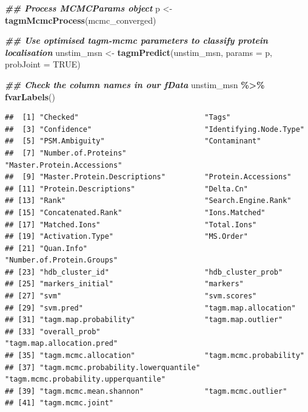 \documentclass[9pt,a4paper,]{extarticle}
\newenvironment{Shaded}{\begin{snugshade}}{\end{snugshade}}
\newcommand{\AttributeTok}[1]{\textcolor[rgb]{0.13,0.29,0.53}{#1}}
\newcommand{\ConstantTok}[1]{\textcolor[rgb]{0.56,0.35,0.01}{#1}}
\newcommand{\DocumentationTok}[1]{\textcolor[rgb]{0.56,0.35,0.01}{\textbf{\textit{#1}}}}
\newcommand{\FunctionTok}[1]{\textcolor[rgb]{0.13,0.29,0.53}{\textbf{#1}}}
\newcommand{\NormalTok}[1]{#1}
\newcommand{\OtherTok}[1]{\textcolor[rgb]{0.56,0.35,0.01}{#1}}
\newcommand{\SpecialCharTok}[1]{\textcolor[rgb]{0.81,0.36,0.00}{\textbf{#1}}}
\begin{document}
\begin{Shaded}
\begin{Highlighting}[]
\DocumentationTok{\#\# Process MCMCParams object}
\NormalTok{p }\OtherTok{\textless{}{-}} \FunctionTok{tagmMcmcProcess}\NormalTok{(mcmc\_converged)}
\end{Highlighting}
\end{Shaded}

\begin{Shaded}
\begin{Highlighting}[]
\DocumentationTok{\#\# Use optimised tagm{-}mcmc parameters to classify protein localisation}
\NormalTok{unstim\_msn }\OtherTok{\textless{}{-}} \FunctionTok{tagmPredict}\NormalTok{(unstim\_msn, }\AttributeTok{params =}\NormalTok{ p, }\AttributeTok{probJoint =} \ConstantTok{TRUE}\NormalTok{)}

\DocumentationTok{\#\# Check the column names in our fData}
\NormalTok{unstim\_msn }\SpecialCharTok{\%\textgreater{}\%} 
  \FunctionTok{fvarLabels}\NormalTok{()}
\end{Highlighting}
\end{Shaded}

\begin{verbatim}
##  [1] "Checked"                             "Tags"                               
##  [3] "Confidence"                          "Identifying.Node.Type"              
##  [5] "PSM.Ambiguity"                       "Contaminant"                        
##  [7] "Number.of.Proteins"                  "Master.Protein.Accessions"          
##  [9] "Master.Protein.Descriptions"         "Protein.Accessions"                 
## [11] "Protein.Descriptions"                "Delta.Cn"                           
## [13] "Rank"                                "Search.Engine.Rank"                 
## [15] "Concatenated.Rank"                   "Ions.Matched"                       
## [17] "Matched.Ions"                        "Total.Ions"                         
## [19] "Activation.Type"                     "MS.Order"                           
## [21] "Quan.Info"                           "Number.of.Protein.Groups"           
## [23] "hdb_cluster_id"                      "hdb_cluster_prob"                   
## [25] "markers_initial"                     "markers"                            
## [27] "svm"                                 "svm.scores"                         
## [29] "svm.pred"                            "tagm.map.allocation"                
## [31] "tagm.map.probability"                "tagm.map.outlier"                   
## [33] "overall_prob"                        "tagm.map.allocation.pred"           
## [35] "tagm.mcmc.allocation"                "tagm.mcmc.probability"              
## [37] "tagm.mcmc.probability.lowerquantile" "tagm.mcmc.probability.upperquantile"
## [39] "tagm.mcmc.mean.shannon"              "tagm.mcmc.outlier"                  
## [41] "tagm.mcmc.joint"
\end{verbatim}
\end{document}
